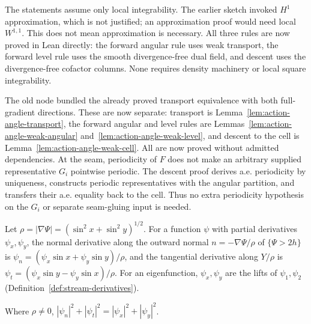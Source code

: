 \begin{remark}
The statements assume only local integrability. The earlier sketch
invoked $H^1$ approximation, which is not justified; an approximation
proof would need local $W^{1,1}$. This does not mean approximation is
necessary. All three rules are now proved in Lean directly: the forward
angular rule uses weak transport, the forward level rule uses the smooth
divergence-free dual field, and descent uses the divergence-free cofactor
columns. None requires density machinery or local square integrability.

The old node bundled the already proved transport equivalence with
both full-gradient directions. These are now separate: transport is
Lemma~\ref{lem:action-angle-transport}, the forward angular and level
rules are Lemmas~\ref{lem:action-angle-weak-angular}
and~\ref{lem:action-angle-weak-level}, and descent to the cell is
Lemma~\ref{lem:action-angle-weak-cell}. All are now proved without
admitted dependencies. At the seam, periodicity of $F$ does not make an
arbitrary supplied representative $G_i$ pointwise periodic. The descent
proof derives a.e. periodicity by uniqueness, constructs periodic
representatives with the angular partition, and transfers their a.e.
equality back to the cell. Thus no extra periodicity hypothesis on the
$G_i$ or separate seam-gluing input is needed.
\end{remark}

\begin{definition}
\label{def:normal-tangent}
\leanok
Let $\rho=|\nabla\Psi|=(\sin^2x+\sin^2y)^{1/2}$. For a function $\psi$ with partial
derivatives $\psi_x,\psi_y$, the normal derivative along the outward normal
$n=-\nabla\Psi/\rho$ of $\{\Psi>2h\}$ is $\psi_n=(\psi_x\sin x+\psi_y\sin y)/\rho$, and the
tangential derivative along $Y/\rho$ is $\psi_t=(\psi_x\sin y-\psi_y\sin x)/\rho$. For an
eigenfunction, $\psi_x,\psi_y$ are the lifts of $\psi_1,\psi_2$
(Definition~\ref{def:stream-derivatives}).
\end{definition}

\begin{lemma}
\label{lem:normal-tangent-frame}
\leanok
Where $\rho\ne0$, $|\psi_n|^2+|\psi_t|^2=|\psi_x|^2+|\psi_y|^2$.
\end{lemma}

